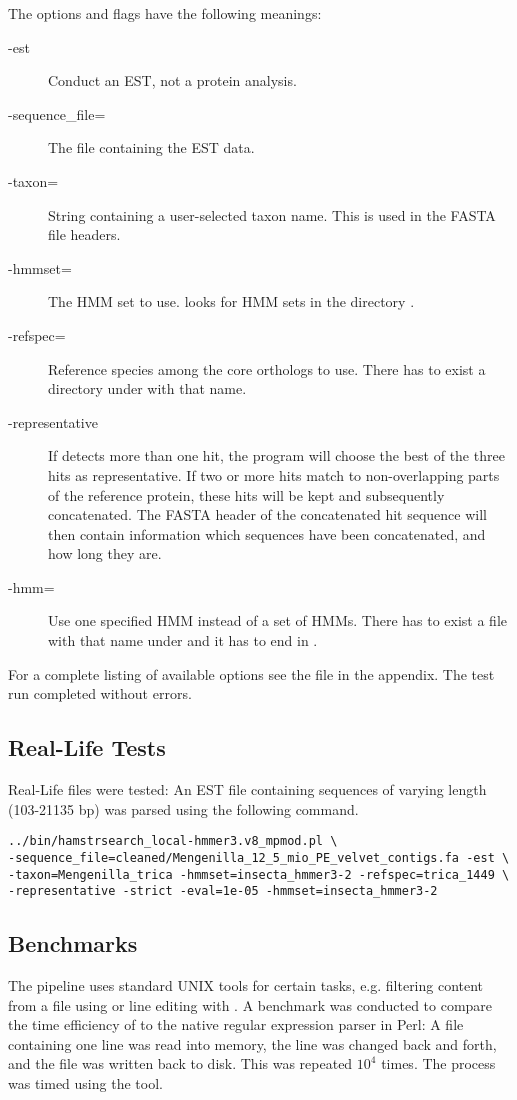 The options and flags have the following meanings:
\begin{description}
	\item[-est] Conduct an EST, not a protein analysis.
	\item[-sequence\_file=] The file containing the EST data.
	\item[-taxon=] String containing a user-selected taxon name. This is used in the FASTA file headers.
	\item[-hmmset=] The HMM set to use. \hamstr looks for HMM sets in the directory .
	\item[-refspec=] Reference species among the core orthologs to use. There has to exist a directory under  with that name.
	\item[-representative] If \hamstr detects more than one hit, the program will choose the best of the three hits as representative. If two or more hits match to non-overlapping parts of the reference protein, these hits will be kept and subsequently concatenated. The FASTA header of the concatenated hit sequence will then contain information which sequences have been concatenated, and how long they are.
	\item[-hmm=] Use one specified HMM instead of a set of HMMs. There has to exist a file with that name under  and it has to end in .
\end{description}
For a complete listing of available options see the \hamstr {} file in the appendix. The test run completed without errors.

\subsection{Real-Life Tests}
Real-Life files were tested: An EST file containing sequences of varying length (103-21135 bp) was parsed using the following command.

\begin{verbatim}
../bin/hamstrsearch_local-hmmer3.v8_mpmod.pl \
-sequence_file=cleaned/Mengenilla_12_5_mio_PE_velvet_contigs.fa -est \
-taxon=Mengenilla_trica -hmmset=insecta_hmmer3-2 -refspec=trica_1449 \
-representative -strict -eval=1e-05 -hmmset=insecta_hmmer3-2 
\end{verbatim}

\subsection{Benchmarks}
The \hamstr pipeline uses standard UNIX tools for certain tasks, e.g. filtering content from a file using  or line editing with . A benchmark was conducted to compare the time efficiency of  to the native regular expression parser in Perl: A file containing one line was read into memory, the line was changed back and forth, and the file was written back to disk. This was repeated $10^4$ times. The process was timed using the  tool.


